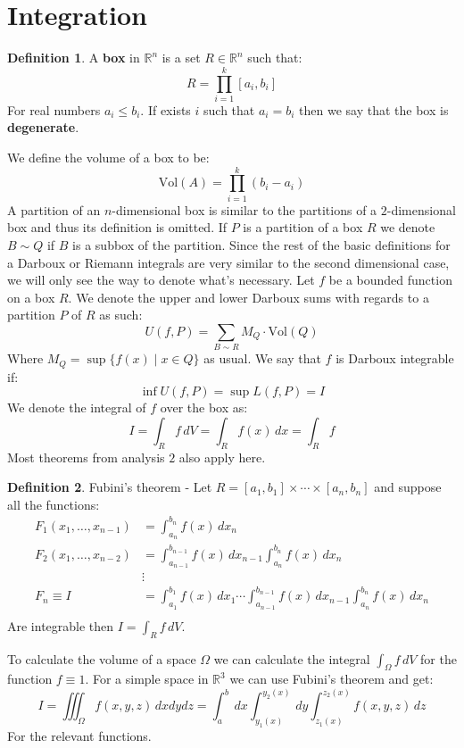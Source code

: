 \documentclass[11pt,a4paper]{article}
\theoremstyle{definition}
\newtheorem{definition}{Definition}[section]
\theoremstyle{plain}
\newcommand{\R}{\mathbb{R}}
\begin{document}
	\section{Integration}
	\begin{definition}
		A \textbf{box} in $\R^n$ is a set $R \in \R^n$ such that:
		\[
			R = \prod_{i=1}^{k}{[a_i,b_i]}
		\]
		For real numbers $a_i \le b_i$. If exists $i$ such that $a_i=b_i$
		then we say that the box is \textbf{degenerate}.
	\end{definition}
	We define the volume of a box to be:
	\[
		\mathrm{Vol}(A) = \prod_{i=1}^{k}{(b_i-a_i)}
	\]
	A partition of an $n$-dimensional box is similar to the partitions
	of a $2$-dimensional box and thus its definition is omitted.
	If $P$ is a partition of a box $R$ we denote $B \sim Q$ if
	$B$ is a subbox of the partition. Since the rest of the basic
	definitions for a Darboux or Riemann integrals are very similar
	to the second dimensional case, we will only see the way
	to denote what's necessary. Let $f$ be a bounded function on
	a box $R$. We denote the upper and lower Darboux sums with
	regards to a partition $P$ of $R$ as such:
	\[
		U(f,P) = \sum_{B \sim R}{M_Q \cdot \mathrm{Vol}(Q)}
	\]
	Where $M_Q = \sup\{f(x) \mid x \in Q\}$ as usual. We say
	that $f$ is Darboux integrable if:
	\[
		\inf U(f,P) = \sup L(f,P) = I
	\]
	We denote the integral of $f$ over the box as:
	\[
		I = \int_{R}{f\,dV} = 
		\int_{R}{f(x)\,dx} = \int_{R}{f}
	\]
	Most theorems from analysis $2$ also apply here.
	\begin{definition}
		Fubini's theorem - Let 
		$R = [a_1,b_1] \times \cdots \times [a_n,b_n]$ and suppose
		all the functions:
		\begin{align*}
			F_1(x_1,\dots,x_{n-1}) &= \int_{a_n}^{b_n}{f(x)\,dx_n} \\
			F_2(x_1,\dots,x_{n-2}) 
			&= \int_{a_{n-1}}^{b_{n-1}}{f(x)\,dx_{n-1}}
			\int_{a_n}^{b_n}{f(x)\,dx_n}\\
			&\vdots \\
			F_n \equiv I &= \int_{a_{1}}^{b_{1}}{f(x)\,dx_{1}} \cdots
			\int_{a_{n-1}}^{b_{n-1}}{f(x)\,dx_{n-1}}
			\int_{a_n}^{b_n}{f(x)\,dx_n} \\
		\end{align*}
		Are integrable then $I = \int_{R}{f\,dV}$.
	\end{definition}
	To calculate the volume of a space $\Omega$ we can calculate
	the integral $\int_{\Omega}{f\,dV}$ for the function $f \equiv 1$.
	For a simple space in $\R^3$ we can use Fubini's theorem and get:
	\[
		I = \iiint_{\Omega}{f(x,y,z)\,dxdydz}
		  = \int_{a}^{b}{\,dx}
		  	\int_{y_1(x)}^{y_2(x)}{\,dy}
		  	\int_{z_1(x)}^{z_2(x)}{f(x,y,z)\,dz}
	\]
	For the relevant functions. \hfill
	
\end{document}
